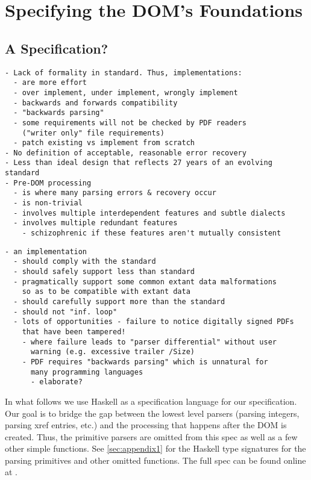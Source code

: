 \section{Specifying the DOM's Foundations }
\label{sec:specifying}

\subsection{A Specification?}

\begin{lstlisting}[style=meta]
- Lack of formality in standard. Thus, implementations:
  - are more effort
  - over implement, under implement, wrongly implement
  - backwards and forwards compatibility
  - "backwards parsing"
  - some requirements will not be checked by PDF readers
    ("writer only" file requirements) 
  - patch existing vs implement from scratch
- No definition of acceptable, reasonable error recovery
- Less than ideal design that reflects 27 years of an evolving standard
- Pre-DOM processing
  - is where many parsing errors & recovery occur
  - is non-trivial
  - involves multiple interdependent features and subtle dialects
  - involves multiple redundant features
    - schizophrenic if these features aren't mutually consistent
\end{lstlisting}

\begin{lstlisting}[style=meta]
- an implementation
  - should comply with the standard
  - should safely support less than standard
  - pragmatically support some common extant data malformations
    so as to be compatible with extant data
  - should carefully support more than the standard
  - should not "inf. loop"
  - lots of opportunities - failure to notice digitally signed PDFs
    that have been tampered!
    - where failure leads to "parser differential" without user
      warning (e.g. excessive trailer /Size)
    - PDF requires "backwards parsing" which is unnatural for
      many programming languages
      - elaborate?
\end{lstlisting}

In what follows we use Haskell \cite{Haskell} as a specification language for
our specification.
%
Our goal is to bridge the gap between the lowest level parsers
(parsing integers, parsing xref entries, etc.) and the processing
that happens after the DOM is created.   Thus, the primitive parsers
are omitted from this spec as well as a few other simple functions.
See \cref{sec:appendix1} for the Haskell type signatures for
the parsing primitives and other omitted functions.
The full spec can be found online at .

